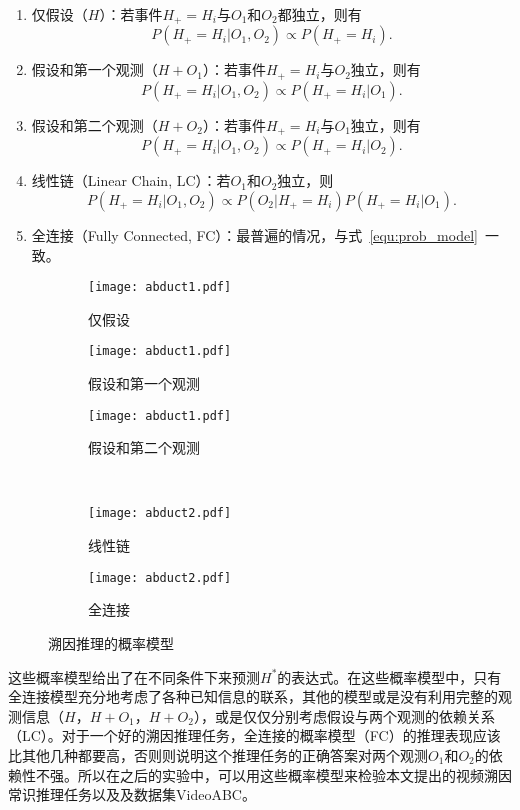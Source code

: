 \begin{enumerate}
    \item 仅假设（$H$）：若事件$H_+=H_i$与$O_1$和$O_2$都独立，则有
    \begin{equation}
        P(H_+=H_i | O_{1}, O_{2})\propto  P(H_+=H_i).
    \end{equation}
    \item 假设和第一个观测（$H+O_1$）：若事件$H_+=H_i$与$O_2$独立，则有
    \begin{equation}
        P(H_+=H_i | O_{1}, O_{2})\propto  P(H_+=H_i|O_1).
    \end{equation}
    \item 假设和第二个观测（$H+O_2$）：若事件$H_+=H_i$与$O_1$独立，则有
    \begin{equation}
        P(H_+=H_i | O_{1}, O_{2})\propto  P(H_+=H_i|O_2).
    \end{equation}
    \item 线性链（Linear Chain, LC）：若$O_1$和$O_2$独立，则
    \begin{equation}
        P(H_+=H_i | O_{1}, O_{2})\propto  P(O_2|H_+=H_i)P(H_+=H_i|O_1).
        \label{equ:LC}
    \end{equation}
    \item 全连接（Fully Connected, FC）：最普遍的情况，与式~\eqref{equ:prob_model}~一致。
\end{enumerate}
\begin{figure}[t]
    \def\firstwidth{.31\textwidth}
    \def\secondwidth{.46\textwidth}
    \centering
    \begin{subfigure}{\firstwidth}
        \texttt{[image: abduct1.pdf]}
        \caption{仅假设}
    \end{subfigure}\hfill%
    \begin{subfigure}{\firstwidth}
        \texttt{[image: abduct1.pdf]}
        \caption{假设和第一个观测}
    \end{subfigure}\hfill%
    \begin{subfigure}{\firstwidth}
        \texttt{[image: abduct1.pdf]}
        \caption{假设和第二个观测}
    \end{subfigure}\\[2em]
    \begin{subfigure}{\secondwidth}
        \texttt{[image: abduct2.pdf]}
        \caption{线性链}
    \end{subfigure}\hfill
    \begin{subfigure}{\secondwidth}
        \texttt{[image: abduct2.pdf]}
        \caption{全连接}
    \end{subfigure}
    \caption{溯因推理的概率模型}
    \label{fig:prob_model}
\end{figure}
这些概率模型给出了在不同条件下来预测$H^*$的表达式。在这些概率模型中，只有全连接模型充分地考虑了各种已知信息的联系，其他的模型或是没有利用完整的观测信息（$H$，$H+O_1$，$H+O_2$），或是仅仅分别考虑假设与两个观测的依赖关系（LC）。对于一个好的溯因推理任务，全连接的概率模型（FC）的推理表现应该比其他几种都要高，否则则说明这个推理任务的正确答案对两个观测$O_1$和$O_2$的依赖性不强。所以在之后的实验中，可以用这些概率模型来检验本文提出的视频溯因常识推理任务以及及数据集VideoABC。

